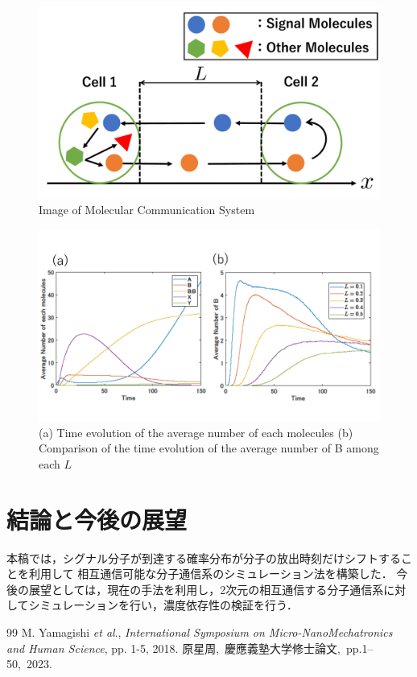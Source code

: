 \documentclass[twocolumn]{jarticle}
\begin{document}
\begin{figure}[t]
    \centering
    \includegraphics[width=0.8\columnwidth] {figures/Images.pdf}
    \caption{Image of Molecular Communication System}
    \label{fig:image}
\end{figure}
\begin{figure}[t]
    \centering
    \includegraphics[width=\columnwidth]{figures/simulation_a_and_b.pdf}
    \caption{(a) Time evolution of the average number of each molecules  (b) Comparison of the time evolution of the average number of B among each $L$}
    \label{fig:simulation}
\end{figure}

\section{結論と今後の展望}
本稿では，シグナル分子が到達する確率分布が分子の放出時刻だけシフトすることを利用して
相互通信可能な分子通信系のシミュレーション法を構築した．
今後の展望としては，現在の手法を利用し，2次元の相互通信する分子通信系に対してシミュレーションを行い，濃度依存性の検証を行う．



\begin{thebibliography} {99}
     M. Yamagishi {\it et al}., %
    { \it International Symposium on Micro-NanoMechatronics and Human Science}, pp. 1-5, 2018.
     原星周,\ 慶應義塾大学修士論文,\ pp.1--50,\ 2023.
\end{thebibliography}
\end{document}
